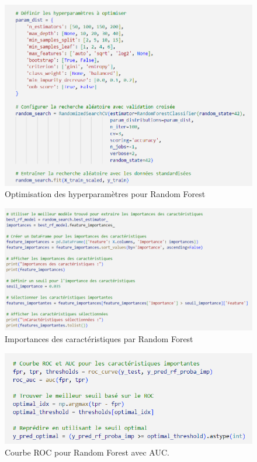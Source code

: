 \begin{figure}[H]
    \centering
    \includegraphics[width=0.9\linewidth]{capture_sas_70.png}
    \caption{Optimisation des hyperparamètres pour Random Forest}
    \label{hyperparametres}
\end{figure}
\vspace{10pt}

\begin{figure}[H]
    \centering
    \includegraphics[width=0.9\linewidth]{capture_sas_71.png}
    \caption{Importances des caractéristiques par Random Forest}
    \label{importance}
\end{figure}
\vspace{10pt}

\begin{figure}[H]
    \centering
    \includegraphics[width=0.7\linewidth]{capture_sas_72.png}
    \caption{Courbe ROC pour Random Forest avec AUC.}
    \label{code_roc}
\end{figure}
\vspace{10pt}

